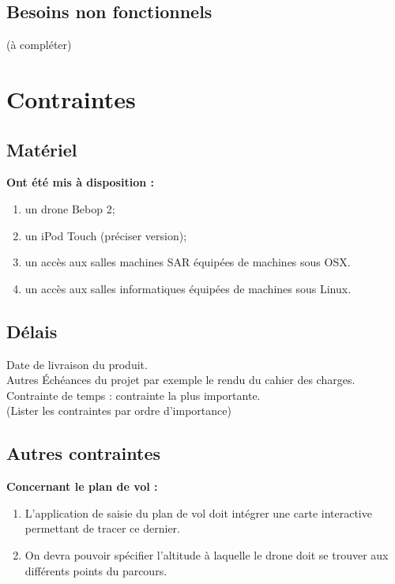 \documentclass{article}
\begin{document}
	\subsection{Besoins non fonctionnels}
	(à compléter)\\
\section{Contraintes}
	\subsection{Matériel}
		\begin{flushleft}
	        \textbf{Ont été mis à disposition :}
	    \end{flushleft}
		\begin{enumerate}
        \item un drone Bebop 2;
        \item un iPod Touch (préciser version);
        \item un accès aux salles machines SAR équipées de machines sous OSX.
        \item un accès aux salles informatiques équipées de machines sous Linux.
        \end{enumerate}
	\subsection{Délais}
		Date de livraison du produit.\\
		Autres Échéances du projet par exemple le rendu du cahier des charges.
		Contrainte de temps : contrainte la plus importante.\\
		(Lister les contraintes par ordre d'importance)
	\subsection{Autres contraintes}
	    \begin{flushleft}
	        \textbf{Concernant le plan de vol :} 
	    \end{flushleft}
	    \begin{enumerate}
            \item  L'application de saisie du plan de vol doit intégrer une carte interactive permettant de tracer ce dernier.
    		 \item On devra pouvoir spécifier l'altitude à laquelle le drone doit se trouver aux différents points du parcours.
		 \end{enumerate}
		
\end{document}
